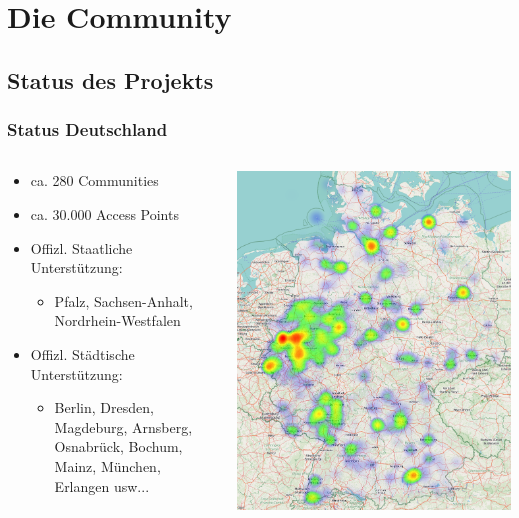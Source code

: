 \section{Die Community}
\subsection{Status des Projekts}

\begin{frame}
\frametitle{Status Deutschland}
	\begin{columns}[c]   
		\begin{column}[T]{0.6\textwidth}     
			\begin{itemize}
				\item ca. 280 Communities \footnotemark[1]
				\item ca. 30.000 Access Points \footnotemark[1]
				\item Offizl. Staatliche Unterstützung:
				\begin{itemize}
					\item Pfalz, Sachsen-Anhalt, Nordrhein-Westfalen 
				\end{itemize}
				\item Offizl. Städtische Unterstützung:
				\begin{itemize}
					\item Berlin, Dresden, Magdeburg, Arnsberg, Osnabrück, Bochum, Mainz, München, Erlangen usw...
				\end{itemize}
			\end{itemize}
		\end{column}
		\begin{column}[T]{0.4\textwidth}     
			\includegraphics[width=\textwidth]{images/heatmap_germany.png} 

\end{column}
\end{columns}
\end{frame}
